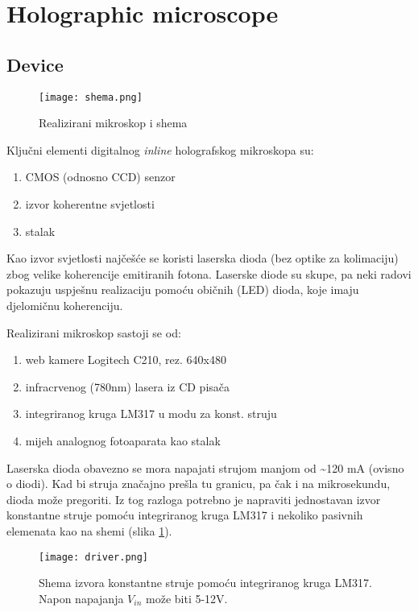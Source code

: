 \documentclass[hidelinks]{ferseminareng}
\begin{document}
	\section{Holographic microscope}
	\subsection{Device}
	\begin{figure}
		\centering
		\texttt{[image: shema.png]}
		\caption{Realizirani mikroskop i shema}
	\end{figure}
	Ključni elementi digitalnog \textit{inline} holografskog mikroskopa su: 
	\begin{enumerate}
		\item CMOS (odnosno CCD) senzor
		\item izvor koherentne svjetlosti
		\item stalak
	\end{enumerate}
	Kao izvor svjetlosti najčešće se koristi laserska dioda (bez optike za kolimaciju) zbog velike koherencije emitiranih fotona. Laserske diode su skupe, pa neki radovi pokazuju uspješnu realizaciju pomoću običnih (LED) dioda, koje imaju djelomičnu koherenciju.
	
	Realizirani mikroskop sastoji se od:
	\begin{enumerate}
		\item web kamere Logitech C210, rez. 640x480
		\item infracrvenog (780nm) lasera iz CD pisača
		\item integriranog kruga LM317 u modu za konst. struju
		\item mijeh analognog fotoaparata kao stalak
	\end{enumerate}
	Laserska dioda obavezno se mora napajati strujom manjom od \textasciitilde120 mA (ovisno o diodi). Kad bi struja značajno prešla tu granicu, pa čak i na mikrosekundu, dioda može pregoriti. Iz tog razloga potrebno je napraviti jednostavan izvor konstantne struje pomoću integriranog kruga LM317 i nekoliko pasivnih elemenata kao na shemi (slika \ref{driver}).
	\begin{figure}
		\centering
		\texttt{[image: driver.png]}
		\caption{Shema izvora konstantne struje pomoću integriranog kruga LM317. Napon napajanja $V_{in}$ može biti 5-12V.}
		\label{driver}
	\end{figure}
\end{document}
